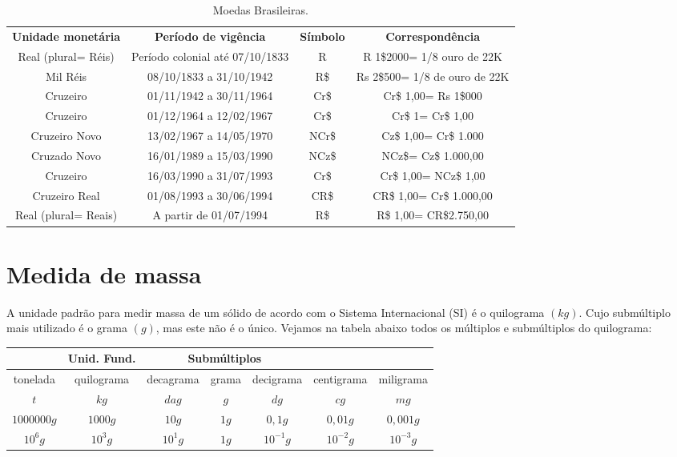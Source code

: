  \begin{table}[H]
 \centering
 \begin{tabular}{|c|c|c|c|} \hline
 \rowcolor{cinza}
 \multicolumn{4}{|c|}{\textbf{Unidades do sistema monetário Brasileiro}} \\
 \hline
 \textbf{Unidade monetária} & \textbf{Período de vigência} & \textbf{Símbolo} & \textbf{Correspondência} \\
\hline
Real (plural= Réis) & Período colonial até 07/10/1833 & R & R 1\$2000= 1/8 ouro de 22K \\
\hline
Mil Réis & 08/10/1833 a 31/10/1942 & R\$ & Rs 2\$500= 1/8 de ouro de 22K \\
\hline
Cruzeiro & 01/11/1942 a 30/11/1964 & Cr\$ & Cr\$ 1,00= Rs 1\$000 \\
\hline
Cruzeiro & 01/12/1964 a 12/02/1967 & Cr\$ & Cr\$ 1= Cr\$ 1,00 \\
\hline
Cruzeiro Novo & 13/02/1967 a 14/05/1970 & NCr\$ & Cz\$ 1,00= Cr\$ 1.000 \\
\hline
Cruzado Novo & 16/01/1989 a 15/03/1990 & NCz\$ & NCz\$= Cz\$ 1.000,00 \\
\hline
Cruzeiro & 16/03/1990 a 31/07/1993 & Cr\$ & Cr\$ 1,00= NCz\$ 1,00 \\
\hline
Cruzeiro Real & 01/08/1993 a 30/06/1994 & CR\$ & CR\$ 1,00= Cr\$ 1.000,00 \\
\hline
Real (plural= Reais) & A partir de 01/07/1994 & R\$ & R\$ 1,00= CR\$2.750,00 \\
\hline

\end{tabular}
\caption{Moedas Brasileiras.}
\end{table}


\section{Medida de massa}
A unidade padrão para medir massa de um sólido de acordo com o Sistema Internacional (SI) é o quilograma $(kg)$. Cujo submúltiplo mais utilizado é o grama $(g)$, mas este não é o único. Vejamos na tabela abaixo todos os múltiplos e submúltiplos do quilograma:

 \begin{table}[H]
 \centering
 \begin{tabular}{|c|c|c|c|c|c|c|} \hline
 \rowcolor{cinza}
  \multicolumn{3}{|c|}{\textbf{Múltiplos}}
 & \multicolumn{1}{|c|}{\textbf{Unid. Fund.}} & \multicolumn{3}{|c|}{\textbf{Submúltiplos}} \\
 \hline
 tonelada & quilograma & decagrama & grama & decigrama & centigrama & miligrama \\
 \hline
 $t$ & $kg$ & $dag$ & $g$ & $dg$ & $cg$ & $mg$ \\ \hline
 $1000000 g$ & $1000 g$ & $10 g$ & $1 g$ & $0,1 g$ & $0,01 g$ & $0,001 g$ \\ \hline
 $10^6 g$ & $10^3 g$ & $10^1 g$ & $1 g$ & $10^{-1} g$ & $10^{-2} g$ & $10^{-3} g$ \\ \hline
 \end{tabular}
\end{table}
